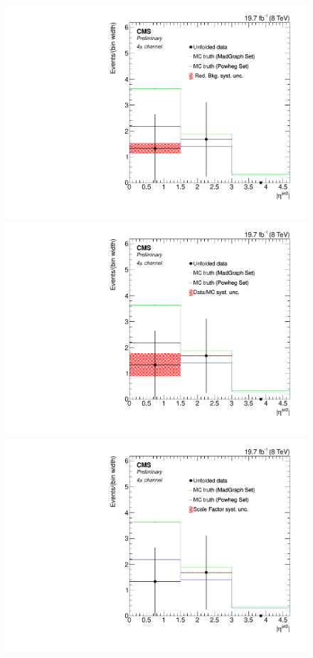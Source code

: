 \begin{figure}[hbtp]
\begin{center}
   \includegraphics[width=0.8\cmsFigWidth]{Figures/Unfolding/Systematics/ZZTo4m_EtaJet2_RedBkg_Mad_fr}     
   \includegraphics[width=0.8\cmsFigWidth]{Figures/Unfolding/Systematics/ZZTo4m_EtaJet2_UnfDataOverGenMC_Mad_fr}     
   \includegraphics[width=0.8\cmsFigWidth]{Figures/Unfolding/Systematics/ZZTo4m_EtaJet2_SFSq_Mad_fr}

\end{center}
\end{figure}
